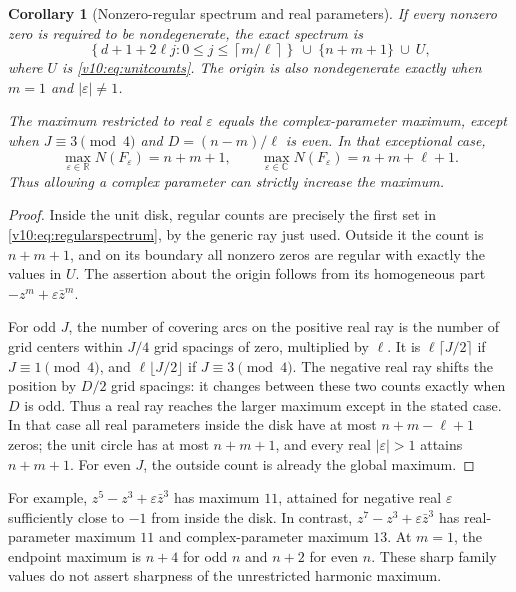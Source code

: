 \documentclass[UTF8,11pt]{ctexart}
\newtheorem{cor}[thm]{Corollary}
\theoremstyle{definition}
\numberwithin{equation}{section}
\newcommand{\C}{\mathbb C}\newcommand{\R}{\mathbb R}
\begin{document}
\begin{cor}[Nonzero-regular spectrum and real parameters]
\label{v10:cor:regularreal}
If every nonzero zero is required to be nondegenerate, the
exact spectrum is
\begin{equation}\label{v10:eq:regularspectrum}
 \left\{d+1+2\ell j:0\le j\le\left\lceil m/\ell\right\rceil\right\}
 \ \cup\ \{n+m+1\}\ \cup\ U,
\end{equation}
where $U$ is \eqref{v10:eq:unitcounts}. The origin is also
nondegenerate exactly when $m=1$ and $|\varepsilon|\ne1$.

The maximum restricted to real $\varepsilon$ equals the
complex-parameter maximum, except when $J\equiv3\pmod4$
and $D=(n-m)/\ell$ is even. In that exceptional case,
\begin{equation}\label{v10:eq:realmaximum}
 \max_{\varepsilon\in\R}N(F_\varepsilon)=n+m+1,
 \qquad
 \max_{\varepsilon\in\C}N(F_\varepsilon)=n+m+\ell+1.
\end{equation}
Thus allowing a complex parameter can strictly increase the maximum.
\end{cor}
\begin{proof}
Inside the unit disk, regular counts are precisely the first
set in \eqref{v10:eq:regularspectrum}, by the generic ray just
used. Outside it the count is $n+m+1$, and on its boundary
all nonzero zeros are regular with exactly the values in $U$.
The assertion about the origin follows from its homogeneous
part $-z^m+\varepsilon\bar z^m$.

For odd $J$, the number of covering arcs on the positive real
ray is the number of grid centers within $J/4$ grid spacings
of zero, multiplied by $\ell$. It is $\ell\lceil J/2\rceil$
if $J\equiv1\pmod4$, and $\ell\lfloor J/2\rfloor$ if
$J\equiv3\pmod4$. The negative real ray shifts the position
by $D/2$ grid spacings: it changes between these two counts
exactly when $D$ is odd. Thus a real ray reaches the larger
maximum except in the stated case. In that case all real
parameters inside the disk have at most $n+m-\ell+1$ zeros;
the unit circle has at most $n+m+1$, and every real
$|\varepsilon|>1$ attains $n+m+1$. For even $J$, the outside
count is already the global maximum.
\end{proof}

For example, $z^5-z^3+\varepsilon\bar z^3$ has maximum $11$,
attained for negative real $\varepsilon$ sufficiently close
to $-1$ from inside the disk. In contrast,
$z^7-z^3+\varepsilon\bar z^3$ has real-parameter maximum $11$
and complex-parameter maximum $13$. At $m=1$, the endpoint
maximum is $n+4$ for odd $n$ and $n+2$ for even $n$.
These sharp family values do not assert sharpness of the
unrestricted harmonic maximum.
\end{document}
